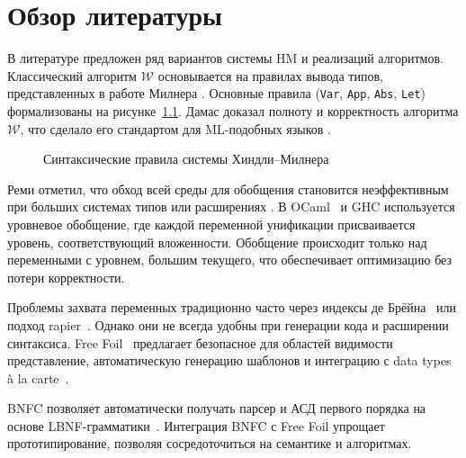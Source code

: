\chapter{Обзор литературы}
\label{chap:background}

В литературе предложен ряд вариантов системы HM и реализаций алгоритмов. Классический алгоритм $\mathcal{W}$ основывается на правилах вывода типов, представленных в работе Милнера \cite{Milner1978_TypePolymorphism}. Основные правила (\texttt{Var}, \texttt{App}, \texttt{Abs}, \texttt{Let}) формализованы на рисунке~\ref{fig:syntactical-hm-rules}. Дамас доказал полноту и корректность алгоритма $\mathcal{W}$, что сделало его стандартом для ML-подобных языков \cite{Damas1984_TypeAssignment}.

\begin{figure}[H]
  \caption{Синтаксические правила системы Хиндли–Милнера}
  \label{fig:syntactical-hm-rules}
\end{figure}

Реми отметил, что обход всей среды для обобщения становится неэффективным при больших системах типов или расширениях \cite{Remy1992_SortedEqTheoryTypes}. В OCaml~\cite{Kiselyov2022_OCamplTypeChecker} и GHC используется уровневое обобщение, где каждой переменной унификации присваивается уровень, соответствующий вложенности. Обобщение происходит только над переменными с уровнем, большим текущего, что обеспечивает оптимизацию без потери корректности.

Проблемы захвата переменных традиционно часто через индексы де Брёйна~\cite{deBruijn1972} или подход rapier~\cite{Simon2002_SecretsGHC}. Однако они не всегда удобны при генерации кода и расширении синтаксиса. Free Foil~\cite{FreeFoil} предлагает безопасное для областей видимости представление, автоматическую генерацию шаблонов и интеграцию с data types à la carte~\cite{Swierstra2008_a_la_carte}.

BNFC позволяет автоматически получать парсер и АСД первого порядка на основе LBNF-грамматики~\cite{BNFC}. Интеграция BNFC с Free Foil упрощает прототипирование, позволяя сосредоточиться на семантике и алгоритмах.
